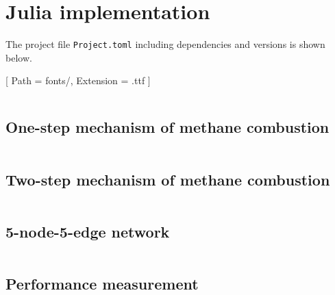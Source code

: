 

\chapter{Julia implementation}

The project file \texttt{Project.toml} including dependencies and versions is shown below.

{
\setmonofont{JuliaMono-Regular}[
    Path      = fonts/,
    Extension = .ttf
]

\inputminted{bash}{code/Project.toml}

\newpage

\section{One-step mechanism of methane combustion} \label{app:one-step}

\inputminted{julia}{code/one_step_methane.jl}

\section{Two-step mechanism of methane combustion} \label{app:two-step}

\inputminted{julia}{code/two_step_methane.jl}

\section{5-node-5-edge network} \label{app:5network}

\inputminted{julia}{code/5network.jl}

\newpage

\section{Performance measurement} \label{app:performance}

\inputminted{julia}{code/measure_performance.jl}

}